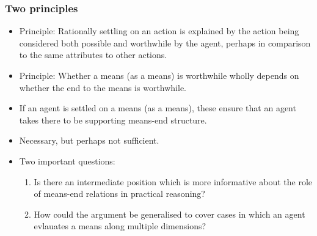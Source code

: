 \documentclass[noamssymb, compress, handout]{beamer} %
\newcommand{\hozlinedash}[0]{%
  \noindent\hdashrule[0.5ex][c]{\textwidth}{.1pt}{2.5pt}
}
\begin{document}
\begin{frame}
  \frametitle{Two principles}

  \begin{itemize}
  \item Principle: Rationally settling on an action is explained by the action being considered both possible and worthwhile by the agent, perhaps in comparison to the same attributes to other actions.
  \item Principle: Whether a means (as a means) is worthwhile wholly depends on whether the end to the means is worthwhile.
  \end{itemize}

  \hozlinedash

  \begin{itemize}
  \item If an agent is settled on a means (as a means), these ensure that an agent takes there to be supporting means-end structure.
  \item Necessary, but perhaps not sufficient.
  \end{itemize}

  \begin{itemize}
  \item Two important questions:
    \begin{enumerate}
    \item Is there an intermediate position which is more informative about the role of means-end relations in practical reasoning?
    \item How could the argument be generalised to cover cases in which an agent evlauates a means along multiple dimensions?
    \end{enumerate}
  \end{itemize}

 \end{frame}
\end{document}
